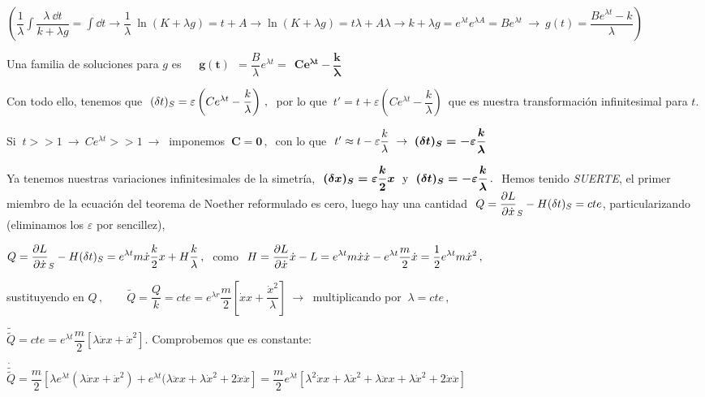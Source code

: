 \begin{footnotesize}\textcolor{gris}{
$\displaystyle  \left( 
 \dfrac 1 \lambda \int \dfrac{\lambda \ \dd t}{k+\lambda g}=\int \dd t  \to  \dfrac 1 \lambda \ \ln (K+\lambda g)=t + A \to   \ln (K+\lambda g)=t \lambda + A \lambda  \to k+\lambda g =e^{\lambda t} e^{\lambda A}=B e^{\lambda t}\ \to \
	g(t)=\dfrac{B e^{\lambda t}-k}{\lambda} \right)$
} \end{footnotesize}

Una familia de soluciones para $g$ es $\quad \boldsymbol{ \boxed{ \ g(t) \ }} \ = \dfrac B \lambda e^{\lambda t} = \ \boldsymbol{\boxed{\ Ce^{\lambda t} - \dfrac k \lambda \ }}$
 
 
Con todo ello, tenemos que $\ (\var t)_S=\varepsilon \left( Ce^{\lambda t} - \dfrac k \lambda \right)\, , \  $ por lo que $\ t'=t+\varepsilon \left( Ce^{\lambda t} - \dfrac k \lambda \right)\, $ que es nuestra transformación infinitesimal para $t$.

Si $\ t>>1 \ \to \ Ce^{\lambda t} >>1 \ \to \ $ imponemos $\boldsymbol{ \ C =0 \,  } , \ $ con lo que $\ t'\approx t- \varepsilon \dfrac k \lambda \ \to \ \boldsymbol{(\var t)_S=-\varepsilon \dfrac k \lambda}$

Ya tenemos nuestras variaciones infinitesimales de la simetría, $\ \boldsymbol{ (\var x)_S=\varepsilon \dfrac k 2 x  }\  \text{ y }\ \boldsymbol{(\var t)_S = -\varepsilon \dfrac k \lambda} \, . \ $ Hemos tenido \emph{SUERTE}, el primer miembro de la ecuación del teorema de Noether reformulado es cero, luego hay una cantidad $\ Q=\displaystyle \pdv{L}{\dot x} (\var x)_S - H(\var t)_S = cte$, particularizando (eliminamos los $\varepsilon$ por sencillez),

$Q=\displaystyle \pdv{L}{\dot x} (\var x)_S - H (\var t)_S=e^{\lambda t} m \dot x \dfrac k 2 x + H \dfrac k \lambda\, , \ $ como $\ H=\displaystyle \pdv{L}{	\dot x} \dot x - L=e^{\lambda t} m \dot x \dot x - e^{\lambda t}\dfrac m 2 \dot x=  \dfrac 1 2 e^{\lambda t} m \dot x^2 \, , \ $ 

sustituyendo en $Q\, , \qquad \tilde{Q}=\dfrac Q k = cte = e^{\lambda r} \dfrac m 2 [\dot x x + \dfrac{\dot x^2}{\lambda}] \ \to \ $ multiplicando por $\ \lambda=cte\, , $

$\tilde{\tilde Q}=cte=e^{\lambda t} \dfrac m 2 [\lambda \dot x x+ \dot x^2]$. Comprobemos que es constante:


$\displaystyle \dot{\tilde{\tilde Q}}=\dfrac m 2 [\lambda e^{\lambda t} (\lambda \dot x x+\dot x^2) +e^{\lambda t} (\lambda \ddot x x + \lambda \dot x^2 + 2 \dot x \ddot x ] =
	\dfrac m 2 e^{\lambda t} [ \lambda^2 \dot x x 
	+\lambda \dot x^2 + \lambda \ddot x x + \lambda \dot x^2 + 2 \dot x \ddot x ]$
	
